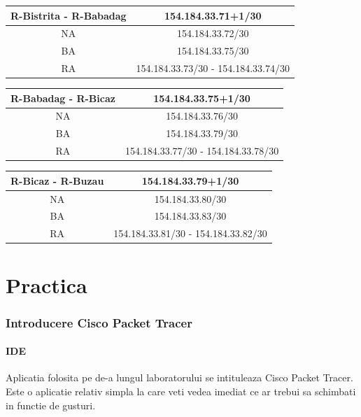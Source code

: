 \documentclass{article}
\begin{document}
\begin{center}
    \begin{tabular}{|c|c|}
    \hline
        R-Bistrita - R-Babadag &154.184.33.71+1/30\\
    \hline \hline
        NA &  154.184.33.72/30 \\
            \hline
        BA & 154.184.33.75/30\\
            \hline
        RA & 154.184.33.73/30 - 154.184.33.74/30 \\
            \hline
    \end{tabular}
\end{center}


\begin{center}
    \begin{tabular}{|c|c|}
    \hline
        R-Babadag - R-Bicaz& 154.184.33.75+1/30\\
    \hline \hline
        NA &  154.184.33.76/30 \\
            \hline
        BA & 154.184.33.79/30\\
            \hline
        RA & 154.184.33.77/30 - 154.184.33.78/30 \\
            \hline
    \end{tabular}
\end{center}


\begin{center}
    \begin{tabular}{|c|c|}
    \hline
        R-Bicaz - R-Buzau & 154.184.33.79+1/30 \\
    \hline \hline
        NA &  154.184.33.80/30 \\
            \hline
        BA & 154.184.33.83/30\\
            \hline
        RA & 154.184.33.81/30 - 154.184.33.82/30 \\
            \hline
    \end{tabular}
\end{center}



\newpage
\part{Practica}


\section{Introducere Cisco Packet Tracer}
\subsection{IDE}
Aplicatia folosita pe de-a lungul laboratorului se intituleaza Cisco Packet Tracer. Este o aplicatie relativ simpla la care veti vedea imediat ce ar trebui sa schimbati in functie de gusturi.
\end{document}
